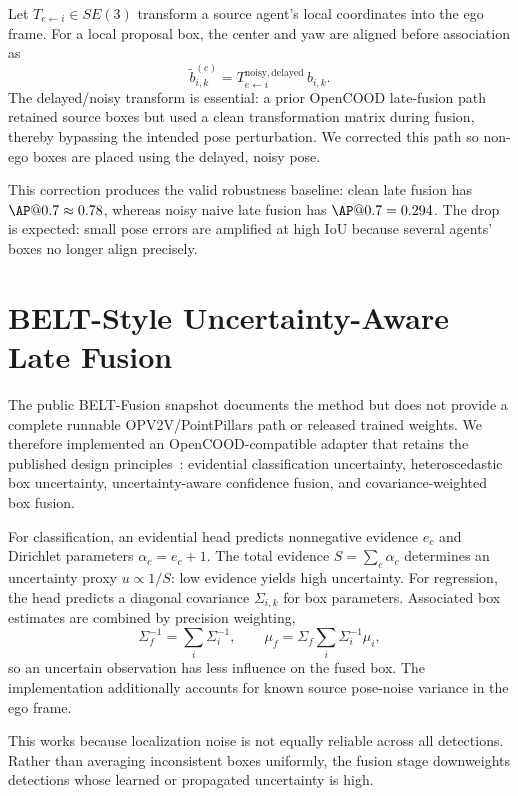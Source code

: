 \documentclass[11pt]{article}
\begin{document}
Let $T_{e\leftarrow i}\in SE(3)$ transform a source agent's local coordinates
into the ego frame. For a local proposal box, the center and yaw are aligned
before association as
\begin{equation}
  \tilde b_{i,k}^{(e)} = T_{e\leftarrow i}^{\mathrm{noisy,delayed}}\,b_{i,k}.
\end{equation}
The delayed/noisy transform is essential: a prior OpenCOOD late-fusion path
retained source boxes but used a clean transformation matrix during fusion,
thereby bypassing the intended pose perturbation. We corrected this path so
non-ego boxes are placed using the delayed, noisy pose.

This correction produces the valid robustness baseline: clean late fusion has
$\AP@0.7\approx0.78$, whereas noisy naive late fusion has $\AP@0.7=0.294$.
The drop is expected: small pose errors are amplified at high IoU because
several agents' boxes no longer align precisely.

\section{BELT-Style Uncertainty-Aware Late Fusion}

The public BELT-Fusion snapshot documents the method but does not provide a
complete runnable OPV2V/PointPillars path or released trained weights. We
therefore implemented an OpenCOOD-compatible adapter that retains the
published design principles~\cite{beltfusion}: evidential classification
uncertainty, heteroscedastic box uncertainty, uncertainty-aware confidence
fusion, and covariance-weighted box fusion.

For classification, an evidential head predicts nonnegative evidence
$e_c$ and Dirichlet parameters $\alpha_c=e_c+1$. The total evidence
$S=\sum_c\alpha_c$ determines an uncertainty proxy $u\propto 1/S$: low
evidence yields high uncertainty. For regression, the head predicts a
diagonal covariance $\Sigma_{i,k}$ for box parameters. Associated box
estimates are combined by precision weighting,
\begin{equation}
  \Sigma_f^{-1}=\sum_i \Sigma_i^{-1},\qquad
  \mu_f=\Sigma_f\sum_i\Sigma_i^{-1}\mu_i,
\end{equation}
so an uncertain observation has less influence on the fused box. The
implementation additionally accounts for known source pose-noise variance in
the ego frame.

This works because localization noise is not equally reliable across all
detections. Rather than averaging inconsistent boxes uniformly, the fusion
stage downweights detections whose learned or propagated uncertainty is high.
\end{document}
